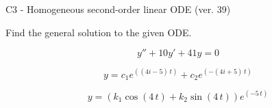 \begin{exercise}
  \begin{exerciseTitle}C3 - Homogeneous second-order linear ODE (ver. 39)\end{exerciseTitle}
  \begin{exerciseStatement}
    
Find the general solution to the given ODE.

    
\[y''+10y'+41y = 0\]

  \end{exerciseStatement}
  \begin{exerciseAnswer}
    
\[y= c_{1} e^{\left(\left(4 i - 5\right) \, t\right)} + c_{2} e^{\left(-\left(4 i + 5\right) \, t\right)}\]

    
\[y= {\left(k_{1} \cos\left(4 \, t\right) + k_{2} \sin\left(4 \, t\right)\right)} e^{\left(-5 \, t\right)}\]

  \end{exerciseAnswer}
\end{exercise}